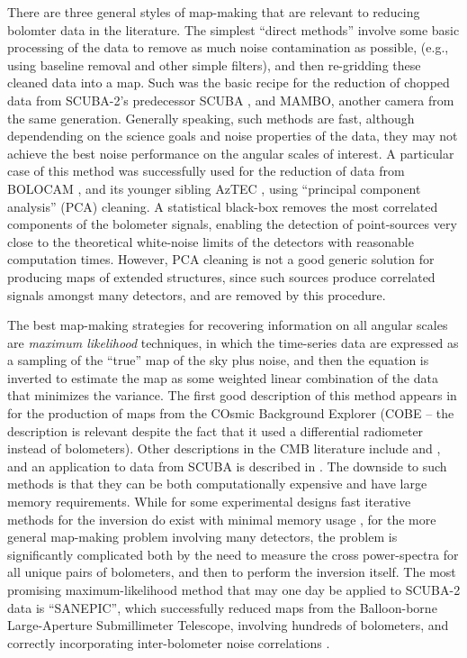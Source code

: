 \documentclass[useAMS,usenatbib,nofootinbib]{mn2e}
\begin{document}
There are three general styles of map-making that are relevant to
reducing bolomter data in the literature. The simplest ``direct
methods'' involve some basic processing of the data to remove as much
noise contamination as possible, (e.g., using baseline removal and
other simple filters), and then re-gridding these cleaned data into a
map. Such was the basic recipe for the reduction of chopped data from
SCUBA-2's predecessor SCUBA
\citep{1998ASPC..145..216J,2000ASPC..216..559J}, and MAMBO, another
camera from the same generation. Generally speaking, such methods are
fast, although dependending on the science goals and noise properties
of the data, they may not achieve the best noise performance on the
angular scales of interest. A particular case of this method was
successfully used for the reduction of data from BOLOCAM
\citep[e.g.][]{laurent2005}, and its younger sibling AzTEC
\citep[e.g.][]{scott2008}, using ``principal component analysis''
(PCA) cleaning. A statistical black-box removes the most correlated
components of the bolometer signals, enabling the detection of
point-sources very close to the theoretical white-noise limits of the
detectors with reasonable computation times. However, PCA cleaning is
not a good generic solution for producing maps of extended structures,
since such sources produce correlated signals amongst many detectors,
and are removed by this procedure.

The best map-making strategies for recovering information on all
angular scales are \emph{maximum likelihood} techniques, in which the
time-series data are expressed as a sampling of the ``true'' map of
the sky plus noise, and then the equation is inverted to estimate the
map as some weighted linear combination of the data that minimizes the
variance.  The first good description of this method appears in
\citet{janssen1992} for the production of maps from the COsmic
Background Explorer (COBE -- the description is relevant despite the
fact that it used a differential radiometer instead of
bolometers). Other descriptions in the CMB literature include
\citet{tegmark1997} and \citet{stompor2002}, and an application to
data from SCUBA is described in \citet{borys2004}.  The downside to
such methods is that they can be both computationally expensive and
have large memory requirements. While for some experimental designs
fast iterative methods for the inversion do exist with minimal memory
usage \citep[e.g.][]{wright1996}, for the more general map-making
problem involving many detectors, the problem is significantly
complicated both by the need to measure the cross power-spectra for
all unique pairs of bolometers, and then to perform the inversion
itself. The most promising maximum-likelihood method that may one day
be applied to SCUBA-2 data is ``SANEPIC'', which successfully reduced
maps from the Balloon-borne Large-Aperture Submillimeter Telescope,
involving hundreds of bolometers, and correctly incorporating
inter-bolometer noise correlations \citep[][]{patanchon2008}.
\end{document}
